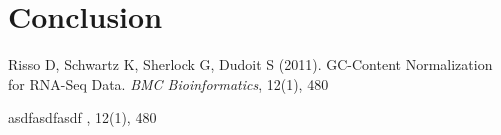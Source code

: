 \documentclass[12pt]{article}
\begin{document}
\section{Conclusion}\label{sec:conclusoes}



\begin{thebibliography}{}

Risso D, Schwartz K, Sherlock G, Dudoit S (2011). GC-Content Normalization for RNA-Seq Data. \textit{BMC Bioinformatics}, 12(1), 480

asdfasdfasdf \textit{}, 12(1), 480

\end{thebibliography}
\end{document}
